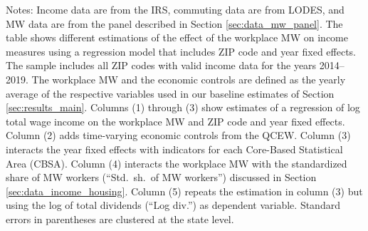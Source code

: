 \begin{table}[hbt!]
    \begin{minipage}{.95\textwidth} \footnotesize
        \vspace{2mm}
        Notes: 
        Income data are from the IRS, commuting data are from LODES, and MW
        data are from the panel described in Section \ref{sec:data_mw_panel}.
        The table shows different estimations of the effect of the workplace MW
        on income measures using a regression model that includes ZIP code and 
        year fixed effects.
        The sample includes all ZIP codes with valid income data for the years 
        2014--2019.
        The workplace MW and the economic controls are defined as the yearly 
        average of the respective variables used in our baseline estimates of 
        Section \ref{sec:results_main}.
        Columns (1) through (3) show estimates of a regression of log total wage
        income on the workplace MW and ZIP code and year fixed effects.
        Column (2) adds time-varying economic controls from the QCEW.
        Column (3) interacts the year fixed effects with indicators for each
        Core-Based Statistical Area (CBSA).
        Column (4) interacts the workplace MW with the standardized share of MW 
        workers (``Std.\ sh.\ of MW workers'') discussed in Section 
        \ref{sec:data_income_housing}.
        Column (5) repeats the estimation in column (3) but using the log of 
        total dividends (``Log div.'') as dependent variable.
        Standard errors in parentheses are clustered at the state level.
    \end{minipage}
\end{table}

